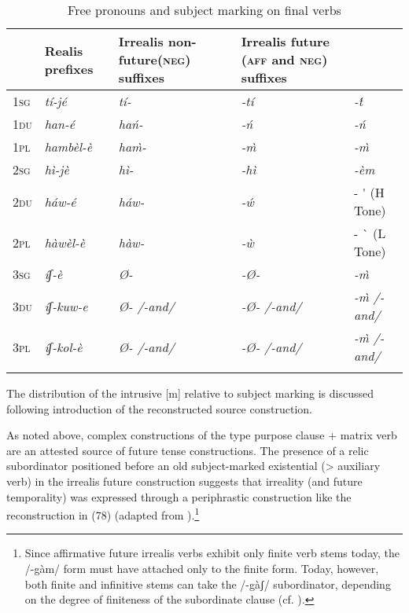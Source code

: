 \documentclass[output=paper]{langsci/langscibook}
\begin{document}
\begin{table}
\caption{Free pronouns and subject marking on final verbs \citep[7]{Ahland2014b}}
\label{tab:mahland:7}
\begin{tabularx}{\textwidth}{llp{1.5cm}Xp{3.5cm}}
\lsptoprule

\multicolumn{2}{X}{ Free pronouns} &  Realis prefixes &  Irrealis non-future\newline (\textsc{neg}) suffixes &  Irrealis future \newline (\textsc{aff} and \textsc{neg}) suffixes\\
\midrule 
 \textsc{1sg} & \itshape tí-jé & \itshape tí- & \itshape {}-tí & \itshape {}-\'{t}\\
 \textsc{1du} & \itshape han-é & \itshape hań- & \itshape {}-ń & \itshape {}-ń\\
 \textsc{1pl} & \itshape hambèl-è & \itshape ha\`{m}- & \itshape {}-\`{m} & \itshape {}-\`{m}\\
 \textsc{2sg} & \itshape hì-jè & \itshape hì- & \itshape {}-hì & \itshape {}-èm \\
 \textsc{2du} & \itshape háw-é & \itshape háw- & \itshape {}-\'{w}   &  - \'{} (H Tone)\\
 \textsc{2pl} & \itshape hàwèl-è & \itshape hàw- & \itshape {}-\`{w} &  - \`{} (L Tone)\\
 \textsc{3sg} & \itshape íʃ-è & \itshape Ø- & \itshape {}-Ø- & \itshape {}-\`{m}\\
 \textsc{3du} & \itshape íʃ-kuw-e & \itshape Ø-   /-and/ & \itshape {}-Ø-   /-and/ & \itshape {}-\`{m}     /-and/\\
 \textsc{3pl} & \itshape íʃ-kol-è & \itshape Ø-   /-and/ & \itshape {}-Ø-   /-and/ & \itshape {}-\`{m}    /-and/\\
\lspbottomrule
\end{tabularx}
\end{table}

The distribution of the intrusive [m] relative to subject marking is discussed following introduction of the reconstructed source construction. 

As noted above, complex constructions of the type purpose clause + matrix verb are an attested source of future tense constructions. The presence of a relic subordinator positioned before an old subject-marked existential ({>} auxiliary verb) in the irrealis future construction suggests that irreality (and future temporality) was expressed through a periphrastic construction like the reconstruction in (78) (adapted from \citealt[11]{Ahland2014b}).\footnote{Since affirmative future irrealis verbs exhibit only finite verb stems today, the /-gàm/ form must have attached only to the finite form. Today, however, both finite and infinitive stems can take the /-gàʃ/ subordinator, depending on the degree of finiteness of the subordinate clause (cf. \citealt[629]{AhlandM2012}).}
\end{document}
